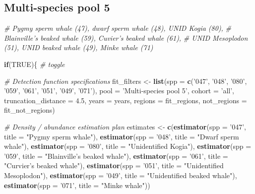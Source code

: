 \documentclass[
]{book}
\newenvironment{Shaded}{\begin{snugshade}}{\end{snugshade}}
\newcommand{\CommentTok}[1]{\textcolor[rgb]{0.56,0.35,0.01}{\textit{#1}}}
\newcommand{\ControlFlowTok}[1]{\textcolor[rgb]{0.13,0.29,0.53}{\textbf{#1}}}
\newcommand{\DataTypeTok}[1]{\textcolor[rgb]{0.13,0.29,0.53}{#1}}
\newcommand{\FloatTok}[1]{\textcolor[rgb]{0.00,0.00,0.81}{#1}}
\newcommand{\KeywordTok}[1]{\textcolor[rgb]{0.13,0.29,0.53}{\textbf{#1}}}
\newcommand{\NormalTok}[1]{#1}
\newcommand{\OtherTok}[1]{\textcolor[rgb]{0.56,0.35,0.01}{#1}}
\newcommand{\StringTok}[1]{\textcolor[rgb]{0.31,0.60,0.02}{#1}}
\begin{document}
\hypertarget{multi-species-pool-5}{%
\subsection*{Multi-species pool 5}\label{multi-species-pool-5}}

\begin{Shaded}
\begin{Highlighting}[]
\CommentTok{# Pygmy sperm whale (47), dwarf sperm whale (48), UNID Kogia (80),}
\CommentTok{# Blainville's beaked whale (59), Cuvier's beaked whale (61),}
\CommentTok{# UNID Mesoplodon (51), UNID beaked whale (49), Minke whale (71)}

\ControlFlowTok{if}\NormalTok{(}\OtherTok{TRUE}\NormalTok{)\{ }\CommentTok{# toggle}

  \CommentTok{# Detection function specifications}
\NormalTok{  fit_filters <-}
\StringTok{    }\KeywordTok{list}\NormalTok{(}\DataTypeTok{spp =} \KeywordTok{c}\NormalTok{(}\StringTok{'047'}\NormalTok{, }\StringTok{'048'}\NormalTok{, }\StringTok{'080'}\NormalTok{, }\StringTok{'059'}\NormalTok{, }\StringTok{'061'}\NormalTok{, }\StringTok{'051'}\NormalTok{, }\StringTok{'049'}\NormalTok{, }\StringTok{'071'}\NormalTok{),}
         \DataTypeTok{pool =} \StringTok{'Multi-species pool 5'}\NormalTok{,}
         \DataTypeTok{cohort =} \StringTok{'all'}\NormalTok{,}
         \DataTypeTok{truncation_distance =} \FloatTok{4.5}\NormalTok{,}
         \DataTypeTok{years =}\NormalTok{ years,}
         \DataTypeTok{regions =}\NormalTok{ fit_regions,}
         \DataTypeTok{not_regions =}\NormalTok{ fit_not_regions)}

  \CommentTok{# Density / abundance estimation plan}
\NormalTok{  estimates <-}
\StringTok{      }\KeywordTok{c}\NormalTok{(}\KeywordTok{estimator}\NormalTok{(}\DataTypeTok{spp =} \StringTok{'047'}\NormalTok{, }\DataTypeTok{title =} \StringTok{"Pygmy sperm whale"}\NormalTok{),}
        \KeywordTok{estimator}\NormalTok{(}\DataTypeTok{spp =} \StringTok{'048'}\NormalTok{, }\DataTypeTok{title =} \StringTok{"Dwarf sperm whale"}\NormalTok{),}
        \KeywordTok{estimator}\NormalTok{(}\DataTypeTok{spp =} \StringTok{'080'}\NormalTok{, }\DataTypeTok{title =} \StringTok{"Unidentified Kogia"}\NormalTok{),}
        \KeywordTok{estimator}\NormalTok{(}\DataTypeTok{spp =} \StringTok{'059'}\NormalTok{, }\DataTypeTok{title =} \StringTok{"Blainville's beaked whale"}\NormalTok{),}
        \KeywordTok{estimator}\NormalTok{(}\DataTypeTok{spp =} \StringTok{'061'}\NormalTok{, }\DataTypeTok{title =} \StringTok{"Curvier's beaked whale"}\NormalTok{),}
        \KeywordTok{estimator}\NormalTok{(}\DataTypeTok{spp =} \StringTok{'051'}\NormalTok{, }\DataTypeTok{title =} \StringTok{"Unidentified Mesoplodon"}\NormalTok{),}
        \KeywordTok{estimator}\NormalTok{(}\DataTypeTok{spp =} \StringTok{'049'}\NormalTok{, }\DataTypeTok{title =} \StringTok{"Unidentified beaked whale"}\NormalTok{),}
        \KeywordTok{estimator}\NormalTok{(}\DataTypeTok{spp =} \StringTok{'071'}\NormalTok{, }\DataTypeTok{title =} \StringTok{"Minke whale"}\NormalTok{))}


\end{Highlighting}
\end{Shaded}
\end{document}
